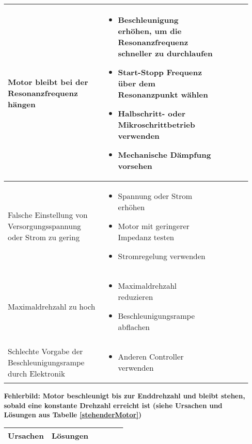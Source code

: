 {{\begin{center}
\begin{tabularx}{\textwidth}{|X|X|X|X|X|X|}
					Motor bleibt bei der Resonanzfrequenz hängen & 
					\begin{itemize} 
						\item {Beschleunigung erhöhen, um die Resonanzfrequenz schneller zu durchlaufen} 
						\item {Start-Stopp Frequenz über dem Resonanzpunkt wählen} 
						\item {Halbschritt- oder Mikroschrittbetrieb verwenden} 
						\item {Mechanische Dämpfung vorsehen} 
					\end{itemize}	 \\	\hline
					Falsche Einstellung von Versorgungsspannung oder Strom zu gering & 
					\begin{itemize}
						\item {Spannung oder Strom erhöhen} 
						\item {Motor mit geringerer Impedanz testen} 
						\item {Stromregelung verwenden}
					\end{itemize}\\	\hline
					Maximaldrehzahl zu hoch & 
					\begin{itemize}
						\item {Maximaldrehzahl reduzieren} 
						\item {Beschleunigungsrampe abflachen}
					\end{itemize}\\ \hline
					Schlechte Vorgabe der Beschleunigungsrampe durch Elektronik & 
					\begin{itemize}
						\item {Anderen Controller verwenden }
					\end{itemize}\\ \hline
				\end{tabularx}
				\label{Beschleunigungsrampe}	
			\end{center}
			
{\textbf{Fehlerbild: Motor beschleunigt bis zur Enddrehzahl und bleibt stehen, sobald eine konstante Drehzahl erreicht ist (siehe Ursachen und Lösungen aus Tabelle \ref{stehenderMotor})}
				\begin{center}
					\fontsize{8}{10}\selectfont
					\begin{tabularx}{\textwidth}{|X|X|X|X|X|X|}
						\hline 
						\textbf{Ursachen} & \textbf{Lösungen} \\ \hline
						

\end{tabularx}
\end{center}}}}
